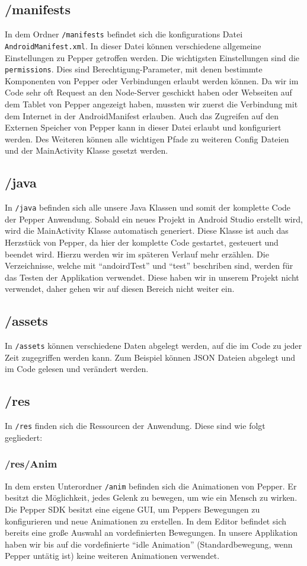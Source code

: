 \subsection*{/manifests}
In dem Ordner \verb|/manifests| befindet sich die konfigurations Datei \verb|AndroidManifest.xml|. In dieser Datei können verschiedene allgemeine Einstellungen zu Pepper getroffen werden. Die wichtigsten Einstellungen sind die \verb|permissions|. Dies sind Berechtigung-Parameter, mit denen bestimmte Komponenten von Pepper oder Verbindungen erlaubt werden können. Da wir im Code sehr oft Request an den Node-Server geschickt haben oder Webseiten auf dem Tablet von Pepper angezeigt haben, mussten wir zuerst die Verbindung mit dem Internet in der AndroidManifest erlauben. Auch das Zugreifen auf den Externen Speicher von Pepper kann in dieser Datei erlaubt und konfiguriert werden. Des Weiteren können alle wichtigen Pfade zu weiteren Config Dateien und der MainActivity Klasse gesetzt werden.

\subsection*{/java}
In  \verb|/java| befinden sich alle unsere Java Klassen und somit der komplette Code der Pepper Anwendung. Sobald ein neues Projekt in Android Studio erstellt wird, wird die MainActivity Klasse automatisch generiert. Diese Klasse ist auch das Herzstück von Pepper, da hier der komplette Code gestartet, gesteuert und beendet wird. Hierzu werden wir im späteren Verlauf mehr erzählen. Die Verzeichnisse, welche mit ``andoirdTest'' und ``test'' beschriben sind, werden für das Testen der Applikation verwendet. Diese haben wir in unserem Projekt nicht verwendet, daher gehen wir auf diesen Bereich nicht weiter ein.

\subsection*{/assets}
In \verb|/assets| können verschiedene Daten abgelegt werden, auf die im Code zu jeder Zeit zugegriffen werden kann. Zum Beispiel können JSON Dateien abgelegt und im Code gelesen und verändert werden.

\subsection*{/res}
In \verb|/res| finden sich die Ressourcen der Anwendung. Diese sind wie folgt gegliedert:

\subsubsection*{/res/Anim}
In dem ersten Unterordner \verb|/anim| befinden sich die Animationen von Pepper. Er besitzt die Möglichkeit, jedes Gelenk zu bewegen, um wie ein Mensch zu wirken. Die Pepper SDK besitzt eine eigene GUI, um Peppers Bewegungen zu konfigurieren und neue Animationen zu erstellen. In dem Editor befindet sich bereits eine große Auswahl an vordefinierten Bewegungen. In unsere Applikation haben wir bis auf die vordefinierte 
``idle Animation''  (Standardbewegung, wenn Pepper untätig ist) keine weiteren Animationen verwendet.

